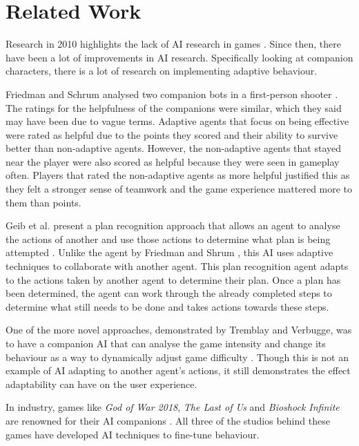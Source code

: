 \documentclass{IEEEtran}
\begin{document}
\section{Related Work}
\label{RelatedWork}

Research in 2010 highlights the lack of AI research in games \cite{RealTimeAICritique2010}. Since then, there have been a lot of improvements in AI research. Specifically looking at companion characters, there is a lot of research on implementing adaptive behaviour.

Friedman and Schrum analysed two companion bots in a first-person shooter \cite{CompanionBotsFPS2019}. The ratings for the helpfulness of the companions were similar, which they said may have been due to vague terms. Adaptive agents that focus on being effective were rated as helpful due to the points they scored and their ability to survive better than non-adaptive agents. However, the non-adaptive agents that stayed near the player were also scored as helpful because they were seen in gameplay often. Players that rated the non-adaptive agents as more helpful justified this as they felt a stronger sense of teamwork and the game experience mattered more to them than points.

Geib et al. present a plan recognition approach that allows an agent to analyse the actions of another and use those actions to determine what plan is being attempted \cite{GeneratingCollabBehaviourPlanRecognition2016}. Unlike the agent by Friedman and Shrum \cite{CompanionBotsFPS2019}, this AI uses adaptive techniques to collaborate with another agent. This plan recognition agent adapts to the actions taken by another agent to determine their plan. Once a plan has been determined, the agent can work through the already completed steps to determine what still needs to be done and takes actions towards these steps.

One of the more novel approaches, demonstrated by Tremblay and Verbugge, was to have a companion AI that can analyse the game intensity and change its behaviour as a way to dynamically adjust game difficulty \cite{tremblay2013adaptive}. Though this is not an example of AI adapting to another agent's actions, it still demonstrates the effect adaptability can have on the user experience.

In industry, games like \textit{God of War 2018}, \textit{The Last of Us} and \textit{Bioshock Infinite} are renowned for their AI companions \cite{PlayDontShow}. All three of the studios behind these games have developed AI techniques to fine-tune behaviour.
\end{document}
